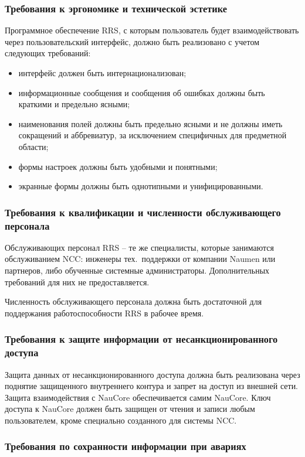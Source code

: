 \subsubsection{Требования к эргономике и технической эстетике}

Программное обеспечение RRS, с которым пользователь будет взаимодействовать
через пользовательский интерфейс,
должно быть реализовано с учетом следующих требований:
\begin{itemize}
    \item интерфейс должен быть интернационализован;
    \item информационные сообщения и сообщения об ошибках должны быть краткими и предельно ясными;
    \item наименования полей должны быть предельно ясными и не должны иметь сокращений и аббревиатур, за исключением специфичных для предметной области;
    \item формы настроек должны быть удобными и понятными;
    \item экранные формы должны быть однотипными и унифицированными.
\end{itemize}

\subsubsection{Требования к квалификации и численности обслуживающего персонала}

Обслуживающих персонал RRS -- те же специалисты, которые занимаются обслуживанием NCC:
инженеры тех.~поддержки от компании Naumen или партнеров,
либо обученные системные администраторы.
Дополнительных требований для них не предоставляется.

Численность обслуживающего персонала должна быть достаточной для поддержания работоспособности RRS в рабочее время.

\subsubsection{Требования к защите информации от несанкционированного доступа}

Защита данных от несанкционированного доступа должна быть реализована через поднятие защищенного внутреннего контура и запрет на доступ из внешней сети.
Защита взаимодействия с NauCore обеспечивается самим NauCore.
Ключ доступа к NauCore должен быть защищен от чтения и записи любым пользователем, кроме специально созданного для системы NCC.

\subsubsection{Требования по сохранности информации при авариях}
\label{subsubsec:требования-по-сохранности-информации-при-авариях}


